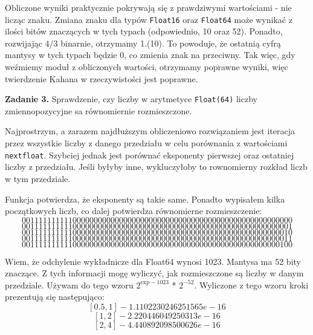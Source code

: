 \documentclass[15pt, a4paper]{article}
\begin{document}

Obliczone wyniki praktycznie pokrywają się z prawdziwymi wartościami - nie licząc znaku. Zmiana znaku dla typów \verb|Float16| oraz \verb|Float64| może wynikać z ilości bitów znaczących w tych typach (odpowiednio, 10 oraz 52). Ponadto, rozwijając 4/3 binarnie, otrzymamy 1.(10). To powoduje, że ostatnią cyfrą mantysy w tych typach będzie 0, co zmienia znak na przeciwny. Tak więc, gdy weźmiemy moduł z obliczonych wartości, otrzymamy poprawne wyniki, więc twierdzenie Kahana w rzeczywistości jest poprawne.

\vspace{0.5cm}

\noindent\hrulefill


\vspace{0.5cm}

\noindent\textbf{Zadanie 3.} Sprawdzenie, czy liczby w arytmetyce \verb|Float(64)| liczby zmiennopozycyjne sa równomiernie rozmieszczone.

\vspace{0.5cm}


Najprostrzym, a zarazem najdłuższym obliczeniowo rozwiązaniem jest iteracja przez wszystkie liczby z danego przedziału w celu porównania z wartościami \verb|nextfloat|. Szybciej jednak jest porównać eksponenty pierwszej oraz ostatniej liczby z przedziału. Jeśli byłyby inne, wykluczyłoby to rownomierny rozkład liczb w tym przedziale.

Funkcja potwierdza, że eksponenty są takie same. Ponadto wypisałem kilka początkowych liczb, co dalej potwierdza równomierne rozmieszczenie:
\[0011111111110000000000000000000000000000000000000000000000000000\]
\[0011111111110000000000000000000000000000000000000000000000000001\]
\[0011111111110000000000000000000000000000000000000000000000000010\]
\[0011111111110000000000000000000000000000000000000000000000000011\]
\[0011111111110000000000000000000000000000000000000000000000000100\]

\vspace{0.5cm}

Wiem, że odchylenie wykładnicze dla Float64 wynosi 1023. Mantysa ma 52 bity znaczące. Z tych informacji mogę wyliczyć, jak rozmieszczone są liczby w danym przedziale. Używam do tego wzoru $2^{\mathrm{exp - 1023}}$ * $2^{\mathrm{-52}}$. Wyliczone z tego wzoru kroki prezentują się następująco:
\[[0.5, 1] - 1.1102230246251565e-16\]
\[[1, 2] - 2.220446049250313e-16\]
\[[2, 4] - 4.440892098500626e-16\]
\end{document}
